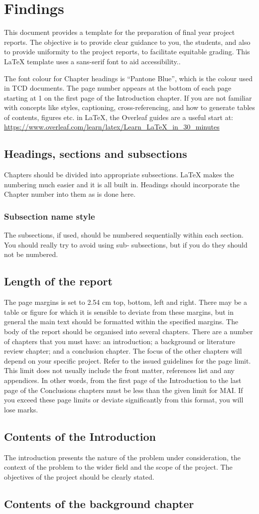 \chapter{Findings}
This document provides a template for the preparation of final year project reports. The objective is to provide clear guidance to you, the students, and also to provide uniformity to the project reports, to facilitate equitable grading.
This LaTeX template uses a sans-serif font to aid accessibility..

The font colour for Chapter headings is “Pantone Blue”, which is the colour used in TCD documents. The page number appears at the bottom of each page starting at 1 on the first page of the Introduction chapter.
If you are not familiar with concepts like styles, captioning, cross-referencing, and how to generate tables of contents, figures etc. in LaTeX, the Overleaf guides are a useful start at: \url{https://www.overleaf.com/learn/latex/Learn_LaTeX_in_30_minutes}
\section{Headings, sections and subsections}
Chapters should be divided into appropriate subsections. LaTeX makes the numbering much easier and it is all built in. Headings should incorporate the Chapter number into them as is done here.

\subsection{Subsection name style}
The subsections, if used, should be numbered sequentially within each section.  You should really try to avoid using sub‐ subsections, but if you do they should not be numbered.

\section{Length of the report}
The page margins is set to 2.54 cm top, bottom, left and right. There may be a table or figure for which it is sensible to deviate from these margins, but in general the main text should be formatted within the specified margins.
The body of the report should be organised into several chapters. There are a number of chapters that you must have: an introduction; a background or literature review chapter; and a conclusion chapter. The focus of the other chapters will depend on your specific project. Refer to the issued guidelines for the page limit. This limit does not usually include the front matter, references list and any appendices. In other words, from the first page of the Introduction to the last page of the Conclusions chapters must be less than the given limit for MAI.
If you exceed these page limits or deviate significantly from this format, you will lose marks.
\section{Contents of the Introduction} 
The introduction presents the nature of the problem under consideration, the context of the problem to the wider field and the scope of the project. The objectives of the project should be clearly stated.
\section{Contents of the background chapter}	
